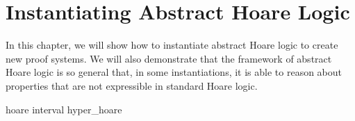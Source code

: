 \chapter{Instantiating Abstract Hoare Logic}

In this chapter, we will show how to instantiate abstract Hoare logic to create 
new proof systems. We will also demonstrate that the framework of abstract Hoare 
logic is so general that, in some instantiations, it is able to reason about 
properties that are not expressible in standard Hoare logic.

{hoare}
{interval}
{hyper_hoare}
